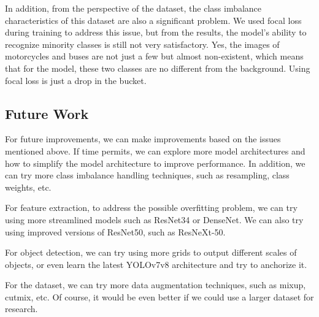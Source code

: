 \documentclass[conference]{IEEEtran}
\begin{document}
In addition, from the perspective of the dataset, the class imbalance characteristics of this dataset are also a significant problem. We used focal loss during training to address this issue, but from the results, the model's ability to recognize minority classes is still not very satisfactory. Yes, the images of motorcycles and buses are not just a few but almost non-existent, which means that for the model, these two classes are no different from the background. Using focal loss is just a drop in the bucket.

\subsection{Future Work}





For future improvements, we can make improvements based on the issues mentioned above. If time permits, we can explore more model architectures and how to simplify the model architecture to improve performance. In addition, we can try more class imbalance handling techniques, such as resampling, class weights, etc.

For feature extraction, to address the possible overfitting problem, we can try using more streamlined models such as ResNet34 or DenseNet. We can also try using improved versions of ResNet50, such as ResNeXt-50.

For object detection, we can try using more grids to output different scales of objects, or even learn the latest YOLOv7v8 architecture and try to anchorize it.

For the dataset, we can try more data augmentation techniques, such as mixup, cutmix, etc. Of course, it would be even better if we could use a larger dataset for research.
\end{document}
